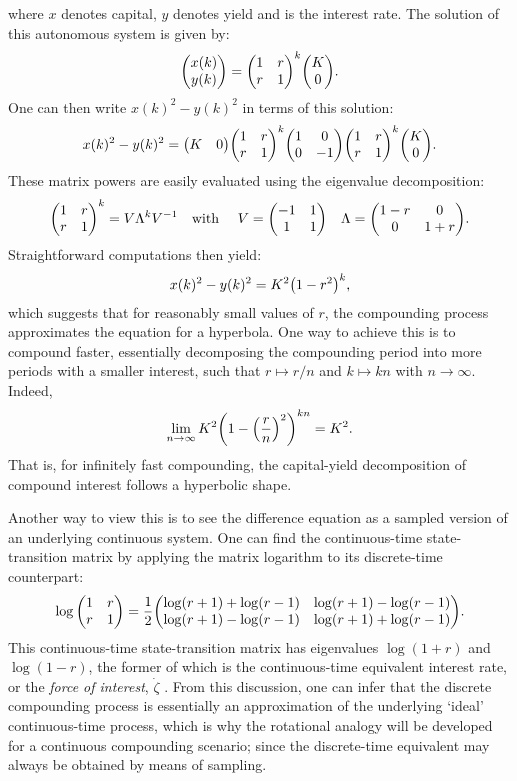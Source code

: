 where $x$ denotes capital, $y$ denotes yield and  is the interest rate. The solution of this autonomous system is given by:
$$ \mqty(x(k)\\y(k)) = \mqty(1& r \\ r & 1)^k\mqty(\ininv\\0). $$
One can then write $x(k)^2 - y(k)^2$ in terms of this solution:
$$ x(k)^2 - y(k)^2 = \mqty(K & 0)\mqty(1& r \\ r & 1)^k\mqty(1 & 0\\0 & -1)\mqty(1& r \\ r & 1)^k\mqty(K\\0).$$
These matrix powers are easily evaluated using the eigenvalue decomposition:
$$ \mqty(1 & r \\  r & 1)^k = V\Lambda^k V^{-1} \qq{with } V = \mqty(-1 & 1 \\ 1 & 1) \quad \Lambda = \mqty(1 - r & 0\\0 & 1 + r). $$
Straightforward computations then yield:
$$ x(k)^2 - y(k)^2 = K^2\qty(1 - r^2)^k, $$
which suggests that for reasonably small values of $r$, the compounding process approximates the equation for a hyperbola. One way to achieve this is to compound faster, essentially decomposing the compounding period into more periods with a smaller interest, such that $r \mapsto r/n$ and $k \mapsto kn$ with $n \to \infty$. Indeed, 
$$ \lim_{n\to\infty} K^2\qty(1 - \qty(\frac{r}{n})^2)^{kn} = K^2. $$
That is, for infinitely fast compounding, the capital-yield decomposition of compound interest follows a hyperbolic shape.

Another way to view this is to see the difference equation as a sampled version of an underlying continuous system. One can find the continuous-time state-transition matrix by applying the matrix logarithm to its discrete-time counterpart:
    $$ \log \mqty(1 & r \\ r & 1) = 
        \frac{1}{2}\mqty(\log(r + 1) + \log(r - 1) & \log(r + 1) - \log(r - 1)\\
                         \log(r + 1) - \log(r - 1) & \log(r + 1) + \log(r - 1)). $$
This continuous-time state-transition matrix has eigenvalues $\log(1 + r)$ and $\log(1 - r)$, the former of which is the continuous-time equivalent interest rate, or the \emph{force of interest}, $\dot{\zeta}$ \cite{Kellison1991}. From this discussion, one can infer that the discrete compounding process is essentially an approximation of the underlying `ideal' continuous-time process, which is why the rotational analogy will be developed for a continuous compounding scenario; since the discrete-time equivalent may always be obtained by means of sampling.

